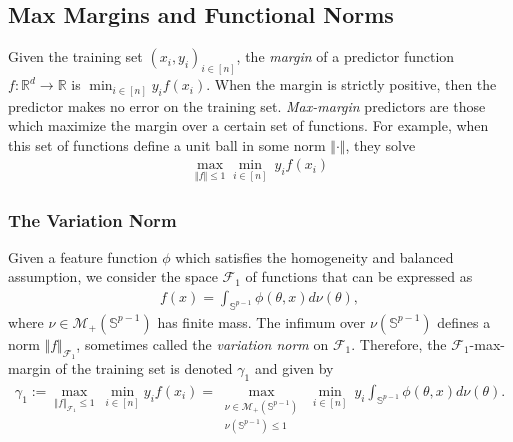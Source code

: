 \documentclass{article}
\begin{document}
\subsection{Max Margins and Functional Norms}
Given the training set $(x_i, y_i)_{i \in [n]}$, the \textit{margin} of a predictor function $f:\mathbb{R}^d \rightarrow \mathbb{R}$ is  $\min_{i \in [n]} y_i f(x_i)$. When the margin is strictly positive, then the predictor makes no error on the training set. \textit{Max-margin} predictors are those which maximize the margin over a certain set of functions. For example, when this set of functions define a unit ball in some norm $\Vert \cdot \Vert$, they solve
\begin{align*}
    \underset{\Vert f \Vert \leq 1}{\max}\underset{i \in [n]}{\min} \ y_if(x_i)
\end{align*}

\subsubsection{The Variation Norm}
Given a feature function $\phi$ which satisfies the homogeneity and balanced assumption, we consider the space $\mathcal{F}_1$ of functions that can be expressed as 
\begin{align*}
    f(x) = \int_{\mathbb{S}^{p-1}}\phi(\theta, x) d\nu(\theta),
\end{align*}
where $\nu \in \mathcal{M}_+(\mathbb{S}^{p-1})$ has finite mass. The infimum over $\nu(\mathbb{S}^{p-1})$ defines a norm $\Vert f \Vert_{\mathcal{F}_1}$, sometimes called the \textit{variation norm} on $\mathcal{F}_1$. Therefore, the $\mathcal{F}_1$-max-margin of the training set is denoted $\gamma_1$ and given by
\begin{align*}
    \gamma_1 :=  \underset{\Vert f \Vert_{\mathcal{F}_1} \leq 1}{\max} \ \underset{i \in [n]}{\min} y_i f(x_i) = \underset{\substack{\nu \in \mathcal{M}_+(\mathbb{S}^{p-1})\\ \nu(\mathbb{S}^{p-1}) \leq 1}}{\max} \ \underset{i \in [n]}{\min} \ y_i \int_{\mathbb{S}^{p-1}}\phi(\theta, x) d\nu(\theta).
\end{align*}
\end{document}
